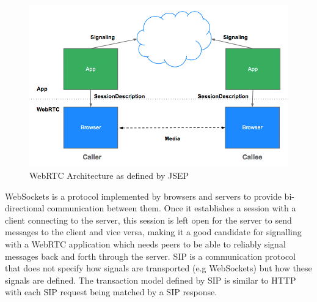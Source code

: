 \documentclass[]{report}
\begin{document}
			\begin{figure}[h!]
				\caption{WebRTC Architecture as defined by JSEP \cite{JSEP}}
				\includegraphics[scale=0.4]{jsep.png}
			\end{figure}
			\newpage
			
			WebSockets is a protocol implemented by browsers and servers to provide bi-directional communication between them\cite{WebSockets}. Once it establishes a session with a client connecting to the server, this session is left open for the server to send messages to the client and vice versa, making it a good candidate for signalling with a WebRTC application which needs peers to be able to reliably signal messages back and forth through the server. SIP is a communication protocol that does not specify how signals are transported (e.g WebSockets) but how these signals are defined. The transaction model defined by SIP is similar to HTTP with each SIP request being matched by a SIP response.
			
\end{document}
